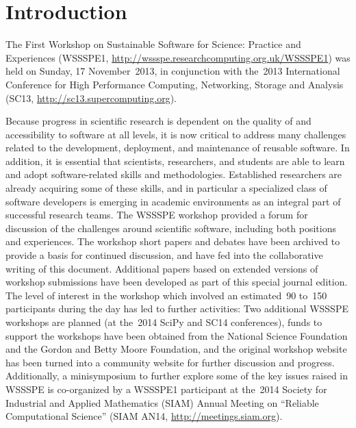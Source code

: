 \documentclass[11pt, oneside]{amsart}
\newcommand{\todo}[1]{{\color{blue}$\blacksquare$~\textsf{[TODO: #1]}}}
\newcommand{\note}[1]{ {\textcolor{red}    { #1 }}}
\begin{document}
\begin{comment}
The original document is
\url{https://docs.google.com/document/d/1eVfioGNlihXG_1Y8BgdCI6tXZKrybZgz5XuQHjT1oKU/edit?pli=1#}
(but can no longer be edited).  Note that the original document has
comments in addition to text.
\end{comment}

%
%
%

\section{Introduction}

The First Workshop on Sustainable Software for Science: Practice and
Experiences (WSSSPE1,
\url{http://wssspe.researchcomputing.org.uk/WSSSPE1}) was held on
Sunday, 17 November~2013, in conjunction with the~2013 International
Conference for High Performance Computing, Networking, Storage and
Analysis (SC13, \url{http://sc13.supercomputing.org}).

Because progress in scientific research is dependent on the quality of and
accessibility to software at all levels, it is now critical to address many
challenges related to the development, deployment, and maintenance of reusable
software.
In addition, it is essential that scientists,
researchers, and students are able to learn and adopt software-related skills
and methodologies. Established researchers are already acquiring some of these
skills, and in particular a specialized class of software developers is
emerging in academic environments as an integral part of
successful research teams. The WSSSPE workshop  provided a forum
for discussion of the challenges around scientific software, including both positions and experiences. The
workshop short papers and debates have been archived to provide a basis for continued
discussion, and have fed into the collaborative writing of this
document. Additional papers based on extended versions of workshop
submissions have been developed as part of this special journal edition. The level of interest in the workshop which involved 
an estimated~90 to~150 participants during the day has led to further activities:
Two additional WSSSPE workshops are planned  (at the~2014 SciPy and SC14 conferences), 
funds to support the workshops have been obtained from 
the National Science Foundation and the Gordon and Betty Moore
Foundation, and the
original workshop website has been turned into a community website for
further discussion and progress. Additionally, a minisymposium  to
further explore some of the key issues raised in WSSSPE is co-organized by a
WSSSPE1 participant at the~2014 Society for Industrial and Applied Mathematics
(SIAM) Annual Meeting on ``Reliable
Computational Science'' (SIAM AN14, \url{http://meetings.siam.org}).
\end{document}
